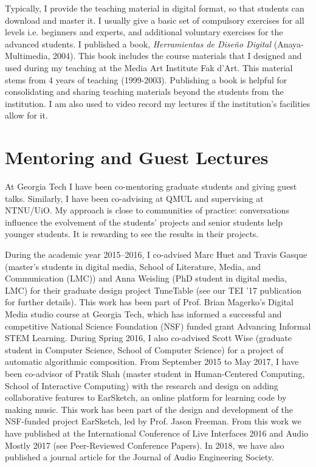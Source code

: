 \documentclass[10pt, a4paper]{article}
\begin{document}
Typically, I provide the teaching material in digital format, so that students can download and master it. I usually give a basic set of compulsory exercises for all levels i.e. beginners and experts, and additional voluntary exercises for the advanced students. I published a book, \emph{Herramientas de Diseño Digital} (Anaya-Multimedia, 2004). This book includes the course materials that I designed and used during my teaching at the Media Art Institute Fak d'Art. This material stems from 4 years of teaching (1999-2003). Publishing a book is helpful for consolidating and sharing teaching materials beyond the students from the institution. 
I am also used to video record my lectures if the institution's facilities allow for it.

\section*{Mentoring and Guest Lectures}

At Georgia Tech I have been co-mentoring graduate students and giving guest talks. Similarly, I have been co-advising at QMUL and supervising at NTNU/UiO. My approach is close to communities of practice: conversations influence the evolvement of the students' projects and senior students help younger students. It is rewarding to see the results in their projects.

During the academic year 2015--2016, I co-advised Marc Huet and Travis Gasque (master's students in digital media, School of Literature, Media, and Communication (LMC)) and Anna Weisling (PhD student in digital media, LMC) for their graduate design project TuneTable (see our TEI '17 publication for further details). This work has been part of Prof. Brian Magerko’s Digital Media studio course at Georgia Tech, which has informed a successful and competitive National Science Foundation (NSF) funded grant Advancing Informal STEM Learning. During Spring 2016, I also co-advised Scott Wise (graduate student in Computer Science, School of Computer Science) for a project of automatic algorithmic composition. From September 2015 to May 2017, I have been co-advisor of Pratik Shah (master student in Human-Centered Computing, School of Interactive Computing) with the research and design on adding collaborative features to EarSketch, an online platform for learning code by making music. This work has been part of the design and development of the NSF-funded project EarSketch, led by Prof. Jason Freeman. From this work we have published at the International Conference of Live Interfaces 2016 and Audio Mostly 2017 (see Peer-Reviewed Conference Papers). In 2018, we have also published a journal article for the Journal of Audio Engineering Society.
\end{document}
